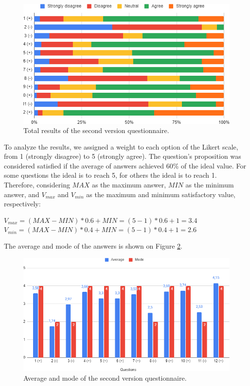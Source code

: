 \begin{figure}[h]
    \caption{Total results of the second version questionnaire.}
    \centerline{\includegraphics{images/survey/final_results_1.png}}
    \label{fig:final_res1}
\end{figure}

To analyze the results, we assigned a weight to each option of the Likert scale, from 1 (strongly disagree) to 5 (strongly agree). The question's proposition was considered satisfied if the average of answers achieved 60\% of the ideal value. For some questions the ideal is to reach 5, for others the ideal is to reach 1. Therefore, considering \(MAX\) as the maximum answer, \(MIN\) as the minimum answer, and \(V_{max}\) and \(V_{min}\) as the maximum and minimum satisfactory value, respectively:

\begin{center}
\(V_{max} = (MAX - MIN) * 0.6 + MIN = (5 - 1) * 0.6 + 1= 3.4\)
\(V_{min} = (MAX - MIN) * 0.4 + MIN = (5 - 1) * 0.4 + 1 = 2.6\)
\end{center}

The average and mode of the answers is shown on Figure \ref{fig:final_res}.

\begin{figure}[h]
    \caption{Average and mode of the second version questionnaire.}
    \centerline{\includegraphics{images/survey/final_results.png}}
    \label{fig:final_res}
\end{figure}

